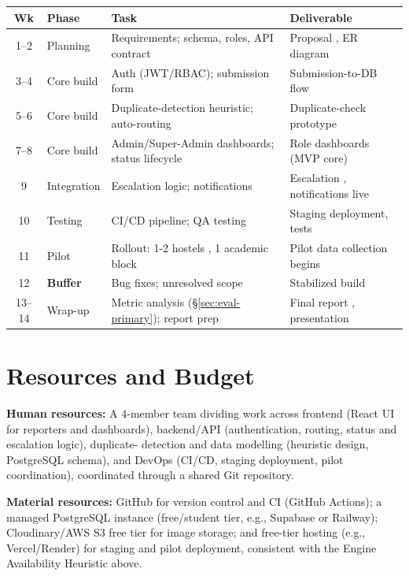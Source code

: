 \documentclass[11pt,a4paper]{article}
\begin{document}
\begin{center}
\small
\begin{tabularx}{\textwidth}{@{}c l X X@{}}
  \toprule
  \textbf{Wk} & \textbf{Phase} & \textbf{Task} & \textbf{Deliverable} \\
  \midrule
  1--2   & Planning    & Requirements; schema, roles, API contract & Proposal , ER diagram \\
  3--4   & Core build  & Auth (JWT/RBAC); submission form & Submission-to-DB flow \\
  5--6   & Core build  & Duplicate-detection heuristic; auto-routing & Duplicate-check prototype \\
  7--8   & Core build  & Admin/Super-Admin dashboards; status lifecycle & Role dashboards (MVP core) \\
  9      & Integration & Escalation logic; notifications & Escalation , notifications live \\
  10     & Testing     & CI/CD pipeline; QA testing & Staging deployment, tests \\
  11     & Pilot       & Rollout: 1-2 hostels , 1 academic block & Pilot data collection begins \\
  12     & \textbf{Buffer} & Bug fixes; unresolved scope & Stabilized build \\
  13--14 & Wrap-up     & Metric analysis (\S\ref{sec:eval-primary}); report prep & Final report , presentation \\
  \bottomrule
\end{tabularx}
\end{center}



\section{Resources and Budget}

\textbf{Human resources:} A 4-member team dividing work across
frontend (React UI for reporters and dashboards), backend/API
(authentication, routing, status and escalation logic), duplicate-
detection and data modelling (heuristic design, PostgreSQL schema), and
DevOps (CI/CD, staging deployment, pilot coordination), coordinated
through a shared Git repository.

\vspace{1em}

\noindent\textbf{Material resources:} GitHub for version control and CI (GitHub
Actions); a managed PostgreSQL instance (free/student tier, e.g.,
Supabase or Railway); Cloudinary/AWS S3 free tier for image storage;
and free-tier hosting (e.g., Vercel/Render) for staging and pilot
deployment, consistent with the Engine Availability Heuristic above.
\end{document}
